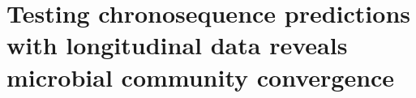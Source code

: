 \chapter{Testing chronosequence predictions with longitudinal data reveals microbial community convergence}
\fancyhead[LE, RO]{\thepage}
\fancyfoot{}
\renewcommand{\headrulewidth}{0pt}
\setlength{\parindent}{1cm}

